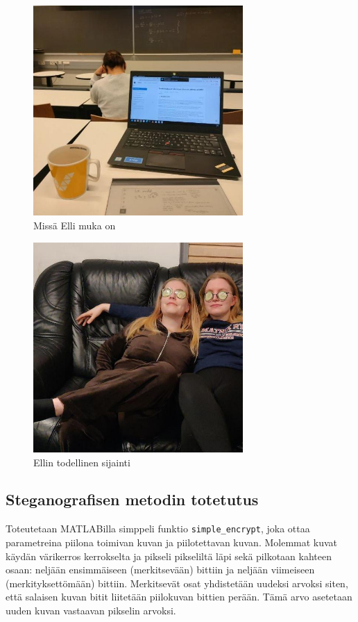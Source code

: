 \documentclass[a4paper,11pt]{article}
\begin{document}
\begin{figure}
    \centering
    \includegraphics[width= 80mm]{kuvat/working-hard.jpg}
    \caption{Missä Elli muka on}
    \label{opiskelukuva}
\end{figure}
\begin{figure}
    \centering
    \includegraphics[width= 80mm]{kuvat/sillis-chilli.jpg}
    \caption{Ellin todellinen sijainti}
    \label{silliskuva}
\end{figure}

\subsection{Steganografisen metodin totetutus}

Toteutetaan MATLABilla simppeli funktio \texttt{simple\_encrypt}, joka ottaa parametreina piilona toimivan kuvan ja piilotettavan kuvan. Molemmat kuvat käydän värikerros kerrokselta ja pikseli pikseliltä läpi sekä pilkotaan kahteen osaan: neljään ensimmäiseen (merkitsevään) bittiin ja neljään viimeiseen (merkityksettömään) bittiin. Merkitsevät osat yhdistetään uudeksi arvoksi siten, että salaisen kuvan bitit liitetään piilokuvan bittien perään. Tämä arvo asetetaan uuden kuvan vastaavan pikselin arvoksi.
\end{document}
